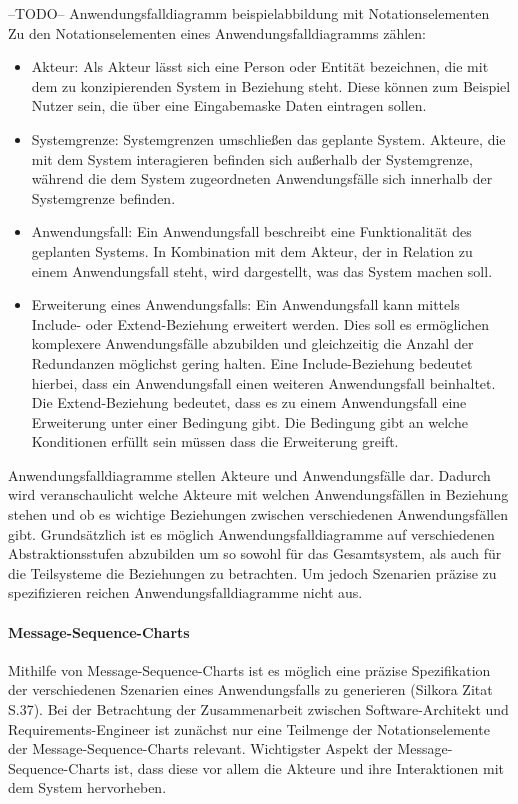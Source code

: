 --TODO-- Anwendungsfalldiagramm beispielabbildung mit Notationselementen\\

Zu den Notationselementen eines Anwendungsfalldiagramms z\"ahlen:
\begin{itemize}
\item Akteur: Als Akteur l\"asst sich eine Person oder Entit\"at bezeichnen, die mit dem zu konzipierenden System in Beziehung steht. Diese k\"onnen zum Beispiel Nutzer sein, die \"uber eine Eingabemaske Daten eintragen sollen.
\item Systemgrenze: Systemgrenzen umschlie\ss{}en das geplante System. Akteure, die mit dem System interagieren befinden sich au\ss{}erhalb der Systemgrenze, w\"ahrend die dem System zugeordneten Anwendungsf\"alle sich innerhalb der Systemgrenze befinden.
\item Anwendungsfall: Ein Anwendungsfall beschreibt eine Funktionalit\"at des geplanten Systems. In Kombination mit dem Akteur, der in Relation zu einem Anwendungsfall steht, wird dargestellt, was das System machen soll.
\item Erweiterung eines Anwendungsfalls: Ein Anwendungsfall kann mittels Include- oder Extend-Beziehung erweitert werden. Dies soll es erm\"oglichen komplexere Anwendungsf\"alle abzubilden und gleichzeitig die Anzahl der Redundanzen m\"oglichst gering halten. Eine Include-Beziehung bedeutet hierbei, dass ein Anwendungsfall einen weiteren Anwendungsfall beinhaltet. Die Extend-Beziehung bedeutet, dass es zu einem Anwendungsfall eine Erweiterung unter einer Bedingung gibt. Die Bedingung gibt an welche Konditionen erfüllt sein müssen dass die Erweiterung greift.
\end{itemize}
Anwendungsfalldiagramme stellen Akteure und Anwendungsfälle dar. Dadurch wird veranschaulicht welche Akteure mit welchen Anwendungsfällen in Beziehung stehen und ob es wichtige Beziehungen zwischen verschiedenen Anwendungsfällen gibt. Grundsätzlich ist es möglich Anwendungsfalldiagramme auf verschiedenen Abstraktionsstufen abzubilden um so sowohl für das Gesamtsystem, als auch für die Teilsysteme die Beziehungen zu betrachten. Um jedoch Szenarien präzise zu spezifizieren reichen Anwendungsfalldiagramme nicht aus.\\

\paragraph{Message-Sequence-Charts}
Mithilfe von Message-Sequence-Charts ist es möglich eine präzise Spezifikation der verschiedenen Szenarien eines Anwendungsfalls zu generieren (Silkora Zitat S.37). Bei der Betrachtung der Zusammenarbeit zwischen Software-Architekt und Requirements-Engineer ist zunächst nur eine Teilmenge der Notationselemente der Message-Sequence-Charts relevant. Wichtigster Aspekt der Message-Sequence-Charts ist, dass diese vor allem die Akteure und ihre Interaktionen mit dem System hervorheben.\\

